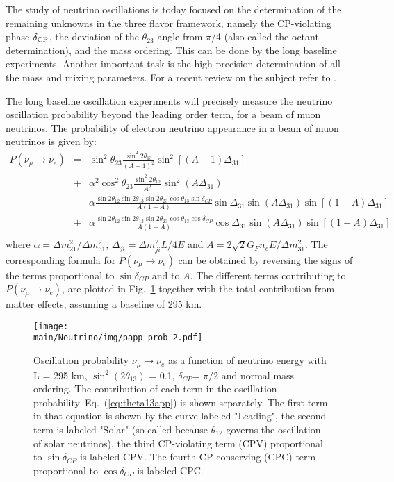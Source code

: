 

The study of neutrino oscillations is today focused on the determination of the remaining unknowns in the three flavor framework,
namely the CP-violating phase $\delta_{\rm CP}$, the deviation of the $\theta_{23}$ angle from $\pi$/4 (also called the octant determination), and the mass ordering. This can be done by the long baseline experiments. Another important task is the high precision determination of all the mass and mixing parameters. For a recent review on the subject refer to \cite{Giganti:2017fhf}. 

The long baseline oscillation experiments will precisely measure the neutrino oscillation probability beyond the leading order term, for a beam of muon neutrinos.
\newpage
The probability of electron neutrino appearance in a beam of muon neutrinos is given by:
\begin{eqnarray}
P(\nu_{\mu} \rightarrow \nu_e) & = & \sin^2 \theta_{23} \frac{\sin^2 2 \theta_{13}}{(A-1)^2} \sin^2 [(A-1) \Delta_{31}] \nonumber \\
&+& \alpha^2 \cos^2 \theta_{23} \frac{\sin^2 2 \theta_{12}}{A^2} \sin^2 (A\Delta_{31}) \nonumber \\
&-& \alpha \frac{\sin 2 \theta_{12}\sin 2 \theta_{13}\sin 2 \theta_{23}\cos  \theta_{13}\sin  \delta_{CP}}{A (1-A)} \sin \Delta_{31} \sin (A\Delta_{31})\sin[ (1-A) \Delta_{31}] \nonumber \\
&+& \alpha \frac{\sin 2 \theta_{12}\sin 2 \theta_{13}\sin 2 \theta_{23}\cos  \theta_{13}\cos  \delta_{CP}}{A (1-A)} \cos \Delta_{31} \sin (A\Delta_{31})\sin[ (1-A) \Delta_{31}] \nonumber\\
\label{eq:theta13app}
\end{eqnarray}
where $ \alpha = \Delta m^2_{21} / \Delta m^2_{31}$, $\Delta_{ji}= \Delta m^2_{ji} L / 4 E$ and $A= 2\sqrt 2 G_F n_e E/ \Delta m^2_{31}$.
The corresponding formula for $P(\bar \nu_{\mu} \rightarrow \bar \nu_e)$ can be obtained by reversing the signs of the terms proportional to $\sin \delta_{CP}$ and to $A$. The different terms contributing to $P(\nu_{\mu} \rightarrow \nu_e)$,  are plotted in Fig.~\ref{fig:t2kappprob} together with the total contribution from matter effects, assuming a baseline of 295 km.

\begin{figure} [htbp!]
\begin{center}
\texttt{[image: \\main/Neutrino/img/papp\_prob\_2.pdf]}
\caption{\label{fig:t2kappprob} Oscillation probability $\nu_\mu \rightarrow \nu_e$ as a function of neutrino energy with L = 295 km, ${\sin}^2(2\theta_{13})$ = 0.1, $\delta_{CP}$= $\pi/2$ and normal mass ordering. The contribution of each term in the oscillation probability~Eq.~(\ref{eq:theta13app}) is shown separately. The first term in that equation is shown by the curve labeled "Leading", the second term is labeled "Solar" (so called because $\theta_{12}$ governs the oscillation of solar neutrinos), the third CP-violating term (CPV) proportional to $\sin \delta_{CP}$ is labeled CPV. The fourth CP-conserving (CPC) term proportional to $\cos \delta_{CP}$ is labeled CPC.}
\end{center}
\end{figure}

